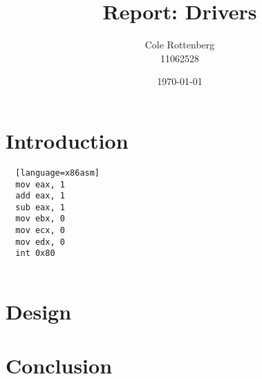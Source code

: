 \documentclass{article}
\title{Report: Drivers}
\author{Cole Rottenberg \\ 11062528}
\date{\today}
\begin{document}
\maketitle

\section*{Introduction}

\begin{lstlisting}
  [language=x86asm]
  mov eax, 1
  add eax, 1
  sub eax, 1
  mov ebx, 0
  mov ecx, 0
  mov edx, 0
  int 0x80
  
\end{lstlisting}

\section*{Design}


\section*{Conclusion}
\end{document}

